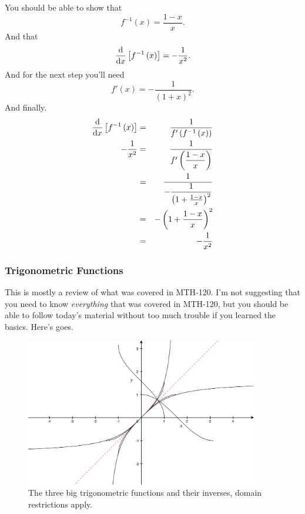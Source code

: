 \documentclass[12pt,addpoints, answers, fleqn]{exam}
\begin{document}
\begin{solution}
You should be able to show that
\[
f^{-1} \left( x \right) = \frac{1-x}{x}.
\]
And that
\[
\frac{{\rm{d}}}{{\rm{d}}x} \left[ f^{-1} \left( x \right) \right] = -\frac{1}{x^2}.
\]
And for the next step you'll need
\[
f'\left( x \right) = -\frac{1}{\left( 1 + x \right)^2}.
\]
And finally.
\begin{eqnarray*}
\frac{{\rm{d}}}{{\rm{d}}x} \left[ f^{-1} \left( x \right) \right] &=& \frac{1}{f'\left( f^{-1} \left( x \right) \right)}\\
-\frac{1}{x^2} &=& \frac{1}{f'\left( \displaystyle  \frac{1-x}{x} \right)}\\
&=& \frac{1}{ \displaystyle  -\frac{1}{ \left( 1 + \frac{1-x}{x} \right)^2}}\\
&=& - \left( 1 + \frac{1-x}{x} \right)^2\\
&=& -\frac{1}{x^2}
\end{eqnarray*}

\end{solution}

\subsubsection{Trigonometric Functions}

This is mostly a review of what was covered in MTH-120. I'm not suggesting that you need to know \emph{everything} that was covered in MTH-120, but you should be able to follow today's material without too much trouble if you learned the basics. Here's goes.
\begin{figure}[htbp] %
   \centering
   \includegraphics[width=4in]{./graphics/graph1601.pdf} 
   \caption{The three big trigonometric functions and their inverses, domain restrictions apply.}
   \label{fig:graph1601}
\end{figure}
\end{document}
